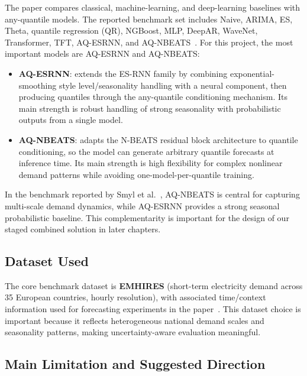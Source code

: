 The paper compares classical, machine-learning, and deep-learning baselines with any-quantile models. The reported benchmark set includes Naive, ARIMA, ES, Theta, quantile regression (QR), NGBoost, MLP, DeepAR, WaveNet, Transformer, TFT, AQ-ESRNN, and AQ-NBEATS~\cite{smyl2025anyquantile}. For this project, the most important models are AQ-ESRNN and AQ-NBEATS:

\begin{itemize}
    \item \textbf{AQ-ESRNN}: extends the ES-RNN family by combining exponential-smoothing style level/seasonality handling with a neural component, then producing quantiles through the any-quantile conditioning mechanism. Its main strength is robust handling of strong seasonality with probabilistic outputs from a single model.
    \item \textbf{AQ-NBEATS}: adapts the N-BEATS residual block architecture to quantile conditioning, so the model can generate arbitrary quantile forecasts at inference time. Its main strength is high flexibility for complex nonlinear demand patterns while avoiding one-model-per-quantile training.
\end{itemize}

In the benchmark reported by Smyl et al.~\cite{smyl2025anyquantile}, AQ-NBEATS is central for capturing multi-scale demand dynamics, while AQ-ESRNN provides a strong seasonal probabilistic baseline. This complementarity is important for the design of our staged combined solution in later chapters.

\subsection{Dataset Used}
\label{subsec:smyl_data}

The core benchmark dataset is \textbf{EMHIRES} (short-term electricity demand across 35 European countries, hourly resolution), with associated time/context information used for forecasting experiments in the paper~\cite{smyl2025anyquantile}. This dataset choice is important because it reflects heterogeneous national demand scales and seasonality patterns, making uncertainty-aware evaluation meaningful.

\subsection{Main Limitation and Suggested Direction}
\label{subsec:smyl_limits}

